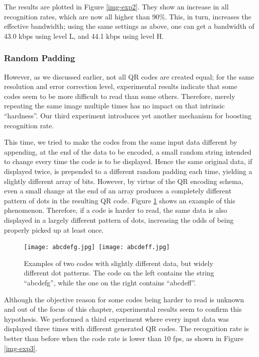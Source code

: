 The results are plotted in Figure \ref{img-exp2}. They show an increase in all recognition rates, which are now all higher than 90\%. This, in turn, increases the effective bandwidth; using the same settings as above, one can get a bandwidth of 43.0 kbps using level L, and 44.1 kbps using level H.

\subsubsection{Random Padding}

However, as we discussed earlier, not all QR codes are created equal; for the same resolution and error correction level, experimental results indicate that some codes seem to be more difficult to read than some others. Therefore, merely repeating the same image multiple times has no impact on that intrinsic ``hardness''. Our third experiment introduces yet another mechanism for boosting recognition rate.

This time, we tried to make the codes from the same input data different by appending, at the end of the data to be encoded, a small random string intended to change every time the code is to be displayed. Hence the same original data, if displayed twice, is prepended to a different random padding each time, yielding a slightly different array of bits. However, by virtue of the QR encoding schema, even a small change at the end of an array produces a completely different pattern of dots in the resulting QR code. Figure \ref{fig:qr:difcodes} shows an example of this phenomenon. Therefore, if a code is harder to read, the same data is also displayed in a largely different pattern of dots, increasing the odds of being properly picked up at least once.

\begin{figure}
\centering
\texttt{[image: abcdefg.jpg]}~\texttt{[image: abcdeff.jpg]}
\caption{Examples of two codes with slightly different data, but widely different dot patterns. The code on the left contains the string ``abcdefg'', while the one on the right contains ``abcdeff''.}
\label{fig:qr:difcodes}
\end{figure}

Although the objective reason for some codes being harder to read is unknown and out of the focus of this chapter, experimental results seem to confirm this hypothesis. We performed a third experiment where every input data was displayed three times with different generated QR codes. The recognition rate is better than before when the code rate is lower than 10 fps, as shown in Figure \ref{img-exp3}. %

